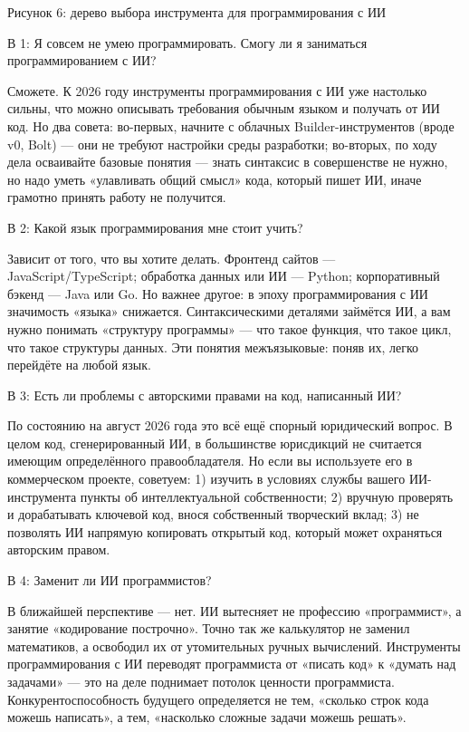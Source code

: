 \begin{center}\small\color{gray}Рисунок 6: дерево выбора инструмента для программирования с ИИ\end{center}


В 1: Я совсем не умею программировать. Смогу ли я заниматься программированием с ИИ?

Сможете. К 2026 году инструменты программирования с ИИ уже настолько сильны, что можно описывать требования обычным языком и получать от ИИ код. Но два совета: во-первых, начните с облачных Builder-инструментов (вроде v0, Bolt) — они не требуют настройки среды разработки; во-вторых, по ходу дела осваивайте базовые понятия — знать синтаксис в совершенстве не нужно, но надо уметь «улавливать общий смысл» кода, который пишет ИИ, иначе грамотно принять работу не получится.

В 2: Какой язык программирования мне стоит учить?

Зависит от того, что вы хотите делать. Фронтенд сайтов — JavaScript/TypeScript; обработка данных или ИИ — Python; корпоративный бэкенд — Java или Go. Но важнее другое: в эпоху программирования с ИИ значимость «языка» снижается. Синтаксическими деталями займётся ИИ, а вам нужно понимать «структуру программы» — что такое функция, что такое цикл, что такое структуры данных. Эти понятия межъязыковые: поняв их, легко перейдёте на любой язык.

В 3: Есть ли проблемы с авторскими правами на код, написанный ИИ?

По состоянию на август 2026 года это всё ещё спорный юридический вопрос. В целом код, сгенерированный ИИ, в большинстве юрисдикций не считается имеющим определённого правообладателя. Но если вы используете его в коммерческом проекте, советуем: 1) изучить в условиях службы вашего ИИ-инструмента пункты об интеллектуальной собственности; 2) вручную проверять и дорабатывать ключевой код, внося собственный творческий вклад; 3) не позволять ИИ напрямую копировать открытый код, который может охраняться авторским правом.

В 4: Заменит ли ИИ программистов?

В ближайшей перспективе — нет. ИИ вытесняет не профессию «программист», а занятие «кодирование построчно». Точно так же калькулятор не заменил математиков, а освободил их от утомительных ручных вычислений. Инструменты программирования с ИИ переводят программиста от «писать код» к «думать над задачами» — это на деле поднимает потолок ценности программиста. Конкурентоспособность будущего определяется не тем, «сколько строк кода можешь написать», а тем, «насколько сложные задачи можешь решать».

